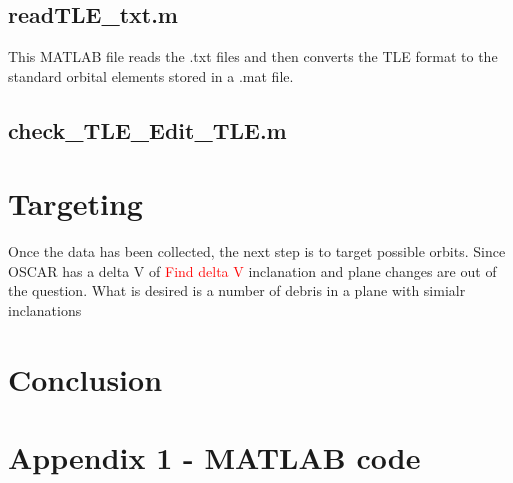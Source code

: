 \documentclass[12pt]{report}
\begin{document}
		\subsection{readTLE\_txt.m}
		This MATLAB file reads the .txt files and then converts the TLE format to the standard orbital elements stored in a .mat file. 
		\subsection{check\_TLE\_Edit\_TLE.m}
		
		
		\section{Targeting}
		Once the data has been collected, the next step is to target possible orbits. Since OSCAR has a delta V of \textcolor{red}{Find delta V} inclanation and plane changes are out of the question. What is desired is a number of debris in a plane with simialr inclanations
	
	\section{Conclusion}
		
		
		
		

		
		\newpage
		\section*{Appendix 1 - MATLAB code}
		
		
		
	
\end{document}
